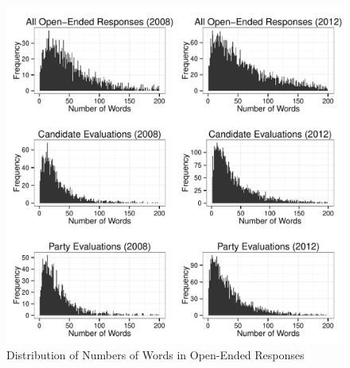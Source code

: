 \documentclass[12pt]{paper}
\begin{document}
\begin{figure}[ht]\centering
\includegraphics[scale=.6]{../calc/fig/a0_num.pdf}
\caption{Distribution of Numbers of Words in Open-Ended Responses}\label{fig:a0_num}
\end{figure}




\end{document}

